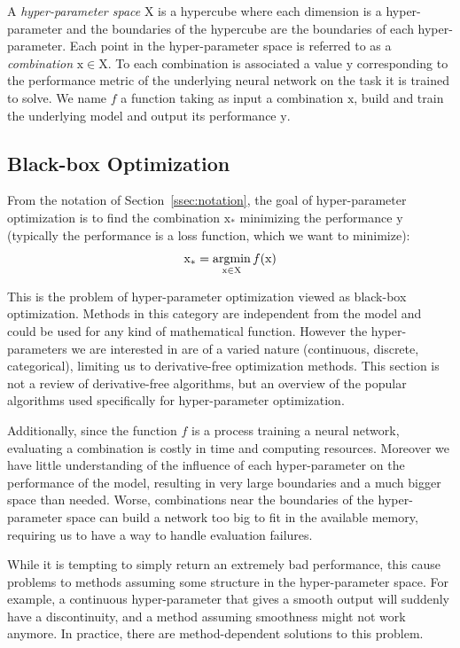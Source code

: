 A \textit{hyper-parameter space} $\mathrm{X}$ is a hypercube where each dimension is a hyper-parameter and the boundaries of the hypercube are the boundaries of each hyper-parameter. Each point in the hyper-parameter space is referred to as a \textit{combination} $\mathrm{x} \in \mathrm{X}$. To each combination is associated a value $\mathrm{y}$ corresponding to the performance metric of the underlying neural network on the task it is trained to solve. We name $f$ a function taking as input a combination $\mathrm{x}$, build and train the underlying model and output its performance $\mathrm{y}$.

\subsection{Black-box Optimization}
\label{ssec:black_box}

From the notation of Section~\ref{ssec:notation}, the goal of hyper-parameter optimization is to find the combination $\mathrm{x_*}$ minimizing the performance $\mathrm{y}$ (typically the performance is a loss function, which we want to minimize):
\begin{equation}
	\mathrm{x_*} = \operatorname*{argmin}_{\mathrm{x} \in \mathrm{X}} f(\mathrm{x})
\end{equation}

This is the problem of hyper-parameter optimization viewed as black-box optimization. Methods in this category are independent from the model and could be used for any kind of mathematical function. However the hyper-parameters we are interested in are of a varied nature (continuous, discrete, categorical), limiting us to derivative-free optimization methods. This section is not a review of derivative-free algorithms, but an overview of the popular algorithms used specifically for hyper-parameter optimization.

Additionally, since the function $f$ is a process training a neural network, evaluating a combination is costly in time and computing resources. Moreover we have little understanding of the influence of each hyper-parameter on the performance of the model, resulting in very large boundaries and a much bigger space than needed. Worse, combinations near the boundaries of the hyper-parameter space can build a network too big to fit in the available memory, requiring us to have a way to handle evaluation failures. 

While it is tempting to simply return an extremely bad performance, this cause problems to methods assuming some structure in the hyper-parameter space. For example, a continuous hyper-parameter that gives a smooth output will suddenly have a discontinuity, and a method assuming smoothness might not work anymore. In practice, there are method-dependent solutions to this problem.

